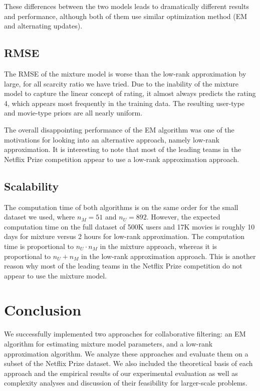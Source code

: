 \documentclass{article}
\begin{document}
These differences between the two models leads to dramatically different results and performance, although both of them use similar optimization method (EM and alternating updates).


\subsection{RMSE}
The RMSE of the mixture model is worse than the low-rank approximation by large, for all scarcity ratio we have tried. Due to the inability of the mixture model to capture the linear concept of rating, it almost always predicts the rating 4, which appears most frequently in the training data. The resulting user-type and movie-type priors are all nearly uniform.

The overall disappointing performance of the EM algorithm was one of the motivations for looking into an alternative approach, namely low-rank approximation. It is interesting to note that most of the leading teams in the Netflix Prize competition appear to use a low-rank approximation approach.




\subsection{Scalability}

The computation time of both algorithms is on the same order for the small dataset we used, where $n_M = 51$ and $n_U = 892$. However, the expected computation time on the full dataset of 500K users and 17K movies is roughly 10 days for mixture versus 2 hours for low-rank approximation. The computation time is proportional to $n_U \cdot n_M$ in the mixture approach, whereas it is proportional to $n_U + n_M$ in the low-rank approximation approach. This is another reason why most of the leading teams in the Netflix Prize competition do not appear to use the mixture model.


\section{Conclusion}

We successfully implemented two approaches for collaborative
filtering: an EM algorithm for estimating mixture model parameters,
and a low-rank approximation algorithm.  We analyze these approaches
and evaluate them on a subset of the Netflix Prize dataset. We also
included the theoretical basis of each approach and the empirical
results of our experimental evaluation as well as complexity analyses
and discussion of their feasibility for larger-scale problems.
\end{document}
